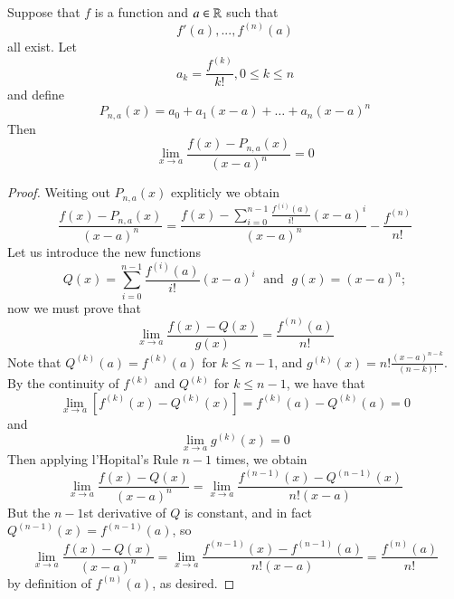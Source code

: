 \begin{thm}\label{thm:smoldiff}
    Suppose that $f$ is a function and $a \in \mathbb R$ such that \begin{equation*}
        f'(a),...,f^{(n)}(a)
    \end{equation*}
    all exist. Let \begin{equation*}
        a_k = \frac{f^{(k)}}{k!}, 0\leq k \leq n
    \end{equation*}
    and define \begin{equation*}
        P_{n,a}(x) = a_0 + a_1(x-a) + \hdots + a_n(x-a)^n
    \end{equation*}
    Then \begin{equation*}
        \lim\limits_{x\rightarrow a}\frac{f(x)-P_{n,a}(x)}{(x-a)^n} = 0
    \end{equation*}
\end{thm}
\begin{proof}
    Weiting out $P_{n,a}(x)$ expliticly we obtain \begin{equation*}
        \frac{f(x) - P_{n,a}(x)}{(x-a)^n} = \frac{f(x) - \sum\limits_{i=0}^{n-1}\frac{f^{(i)}(a)}{i!}(x-a)^i}{(x-a)^n} - \frac{f^{(n)}}{n!}
    \end{equation*}
    Let us introduce the new functions \begin{equation*}
        Q(x) = \sum\limits_{i=0}^{n-1}\frac{f^{(i)}(a)}{i!}(x-a)^i\;\text{ and }\; g(x) = (x-a)^n;
    \end{equation*}
    now we must prove that \begin{equation*}
        \lim\limits_{x\rightarrow a}\frac{f(x) - Q(x)}{g(x)} = \frac{f^{(n)}(a)}{n!}
    \end{equation*}
    Note that $Q^{(k)}(a) = f^{(k)}(a)$ for $k \leq n-1$, and $g^{(k)}(x) =n!\frac{(x-a)^{n-k}}{(n-k)!}$. By the continuity of $f^{(k)}$ and $Q^{(k)}$ for $k \leq n-1$, we have that \begin{equation*}
        \lim\limits_{x\rightarrow a}\left[f^{(k)}(x) - Q^{(k)}(x)\right] = f^{(k)}(a) - Q^{(k)}(a) = 0
    \end{equation*}
    and \begin{equation*}
        \lim\limits_{x\rightarrow a}g^{(k)}(x) = 0
    \end{equation*}
    Then applying l'Hopital's Rule $n-1$ times, we obtain \begin{equation*}
        \lim\limits_{x\rightarrow a}\frac{f(x)-Q(x)}{(x-a)^n} = \lim\limits_{x\rightarrow a}\frac{f^{(n-1)}(x) - Q^{(n-1)}(x)}{n!(x-a)}
    \end{equation*}
    But the $n-1$st derivative of $Q$ is constant, and in fact $Q^{(n-1)}(x) = f^{(n-1)}(a)$, so \begin{equation*}
        \lim\limits_{x\rightarrow a}\frac{f(x)-Q(x)}{(x-a)^n} = \lim\limits_{x\rightarrow a}\frac{f^{(n-1)}(x)-f^{(n-1)}(a)}{n!(x-a)} = \frac{f^{(n)}(a)}{n!}
    \end{equation*}
    by definition of $f^{(n)}(a)$, as desired.
\end{proof}


